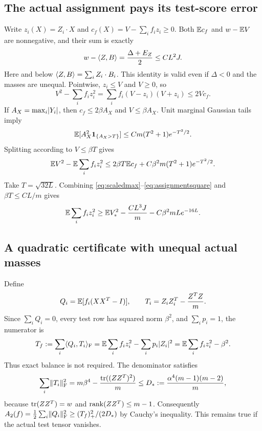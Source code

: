 \subsection{The actual assignment pays its test-score error}
Write $z_i(X)=Z_i\cdot X$ and
$c_f(X)=V-\sum_i f_i z_i\ge0$. Both $\mathbb E c_f$ and $w-\mathbb E V$ are
nonnegative, and their sum is exactly
\begin{equation}\label{eq:routingproxy}
 w-\langle Z,B\rangle=\frac{\Delta+E_Z}{2}\le CL^2J.
\end{equation}
Here and below $\langle Z,B\rangle=\sum_iZ_i\cdot B_i$.
This identity is valid even if $\Delta<0$ and the masses are unequal.
Pointwise, $z_i\le V$ and $V\ge0$, so
\[
 V^2-\sum_i f_i z_i^2
      =\sum_i f_i(V-z_i)(V+z_i)\le2Vc_f.
\]
If $A_X=\max_i\lvert Y_i\rvert$, then $c_f\le2\beta A_X$ and
$V\le\beta A_X$. Unit marginal Gaussian tails imply
\[
 \mathbb E[A_X^2\mathbf 1_{\{A_X>T\}}]
                  \le Cm(T^2+1)e^{-T^2/2}.
\]
Splitting according to $V\le\beta T$ gives
\begin{equation}\label{eq:assignmentsquare}
 \mathbb E V^2-\mathbb E\sum_i f_i z_i^2
       \le2\beta T\mathbb E c_f+C\beta^2m(T^2+1)e^{-T^2/2}.
\end{equation}
Take $T=\sqrt{32L}$. Combining
\eqref{eq:scaledmax}--\eqref{eq:assignmentsquare} and
$\beta T\le CL/m$ gives
\begin{equation}\label{eq:score-square}
 \mathbb E\sum_i f_i z_i^2
       \ge\mathbb E V_*^2-\frac{CL^3J}{m}-C\beta^2mL e^{-16L}.
\end{equation}

\subsection{A quadratic certificate with unequal actual masses}
Define
\[
 Q_i=\mathbb E[f_i(XX^T-I)],\qquad
 T_i=Z_iZ_i^T-\frac{Z^TZ}{m}.
\]
Since $\sum_iQ_i=0$, every test row has squared norm $\beta^2$, and
$\sum_i p_i=1$, the numerator is
\begin{equation}\label{eq:tensor-numerator}
 T_f:=\sum_i\langle Q_i,T_i\rangle_{\mathrm F}
       =\mathbb E\sum_i f_i z_i^2-\sum_i p_i\lvert Z_i\rvert^2
       =\mathbb E\sum_i f_i z_i^2-\beta^2.
\end{equation}
Thus exact balance is not required. The denominator satisfies
\begin{equation}\label{eq:tensor-denominator}
 \sum_i\lVert T_i\rVert_{\mathrm F}^2
 =m\beta^4-\frac{\operatorname{tr}((ZZ^T)^2)}m
 \le D_*:=\frac{\alpha^4(m-1)(m-2)}m,
\end{equation}
because $\operatorname{tr}(ZZ^T)=w$ and $\operatorname{rank}(ZZ^T)\le m-1$.
Consequently $A_2(f)=\frac12\sum_i\lVert Q_i\rVert_{\mathrm F}^2
\ge(T_f)_+^2/(2D_*)$ by Cauchy's inequality. This remains true if
the actual test tensor vanishes.

